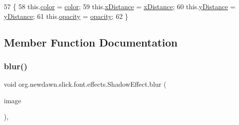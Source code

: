 \begin{DoxyCode}
57                                                                                    \{
58         this.\mbox{\hyperlink{classorg_1_1newdawn_1_1slick_1_1font_1_1effects_1_1_shadow_effect_a4a5a1c31b38b33b042cadabe1593bc62}{color}} = \mbox{\hyperlink{classorg_1_1newdawn_1_1slick_1_1font_1_1effects_1_1_shadow_effect_a4a5a1c31b38b33b042cadabe1593bc62}{color}};
59         this.\mbox{\hyperlink{classorg_1_1newdawn_1_1slick_1_1font_1_1effects_1_1_shadow_effect_a4d3581fba8877de112c8a1ec28cdf03d}{xDistance}} = \mbox{\hyperlink{classorg_1_1newdawn_1_1slick_1_1font_1_1effects_1_1_shadow_effect_a4d3581fba8877de112c8a1ec28cdf03d}{xDistance}};
60         this.\mbox{\hyperlink{classorg_1_1newdawn_1_1slick_1_1font_1_1effects_1_1_shadow_effect_a06d791511d507ab313c764edbde43fa8}{yDistance}} = \mbox{\hyperlink{classorg_1_1newdawn_1_1slick_1_1font_1_1effects_1_1_shadow_effect_a06d791511d507ab313c764edbde43fa8}{yDistance}};
61         this.\mbox{\hyperlink{classorg_1_1newdawn_1_1slick_1_1font_1_1effects_1_1_shadow_effect_a6a03f4db2ffd55023ab5f9fde923dc0e}{opacity}} = \mbox{\hyperlink{classorg_1_1newdawn_1_1slick_1_1font_1_1effects_1_1_shadow_effect_a6a03f4db2ffd55023ab5f9fde923dc0e}{opacity}};
62     \}
\end{DoxyCode}


\subsection{Member Function Documentation}
\mbox{\label{classorg_1_1newdawn_1_1slick_1_1font_1_1effects_1_1_shadow_effect_aed27870d89b30c23752f5dfc30314578}} 
\subsubsection{\texorpdfstring{blur()}{blur()}}
{\footnotesize\ttfamily void org.\+newdawn.\+slick.\+font.\+effects.\+Shadow\+Effect.\+blur (\begin{DoxyParamCaption}\item[{Buffered\+Image}]{image }\end{DoxyParamCaption})\hspace{0.3cm}{\ttfamily [inline]}, {\ttfamily [private]}}

